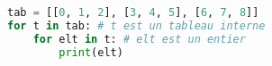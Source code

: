 \documentclass[svgnames,11pt]{beamer}
\begin{document}
\begin{frame}[fragile]
    \frametitle{}

\begin{center}
\begin{lstlisting}[language=Python , basicstyle=\ttfamily\small, xleftmargin=2em, xrightmargin=2em]
tab = [[0, 1, 2], [3, 4, 5], [6, 7, 8]]
for t in tab: # t est un tableau interne
    for elt in t: # elt est un entier
        print(elt)
\end{lstlisting}
\end{center}
\end{frame}
\end{document}
